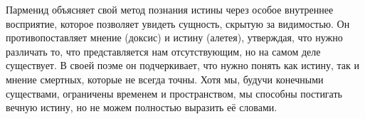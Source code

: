 
Парменид объясняет свой метод познания истины через особое внутреннее восприятие, которое позволяет увидеть сущность, скрытую за видимостью. Он противопоставляет мнение (доксис) и истину (алетея), утверждая, что нужно различать то, что представляется нам отсутствующим, но на самом деле существует. В своей поэме он подчеркивает, что нужно понять как истину, так и мнение смертных, которые не всегда точны. Хотя мы, будучи конечными существами, ограничены временем и пространством, мы способны постигать вечную истину, но не можем полностью выразить её словами.


